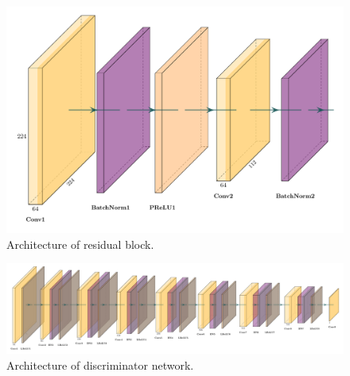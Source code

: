 \documentclass[10pt,twocolumn,letterpaper]{article}
\begin{document}
 \begin{figure}
\begin{center}
\includegraphics[width=1\textwidth]{fig6}
\end{center}
   \caption{Architecture of residual block.}
\label{fig6}
\end{figure}

 \begin{figure}
\begin{center}
\includegraphics[width=1\textwidth]{fig7}
\end{center}
   \caption{Architecture of discriminator network.}
\label{fig7}
\end{figure}
\end{document}
